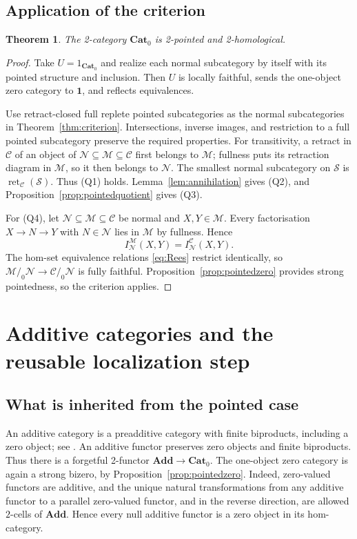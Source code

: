\documentclass[11pt,reqno,a4paper]{amsart}
\newtheorem{theorem}{Theorem}[section]
\theoremstyle{definition}
\theoremstyle{remark}
\newcommand{\C}{\mathcal{C}}
\newcommand{\M}{\mathcal{M}}
\newcommand{\N}{\mathcal{N}}
\newcommand{\0}{\mathbf{0}}
\renewcommand{\1}{\mathbf{1}}
\newcommand{\Pt}{\mathbf{Cat}_{0}}
\newcommand{\Add}{\mathbf{Add}}
\newcommand{\Scl}{\mathcal S}
\newcommand{\pq}[2]{#1/_{\!0}#2}
\DeclareMathOperator{\ret}{ret}
\begin{document}
\subsection{Application of the criterion}

\begin{theorem}\label{thm:pointed}
The 2-category $\Pt$ is 2-pointed and 2-homological.
\end{theorem}
\begin{proof}
Take $U=1_{\Pt}$ and realize each normal subcategory by
itself with its pointed structure and inclusion. Then $U$
is locally faithful, sends the one-object zero category to
$\mathbf1$, and reflects equivalences.

Use retract-closed full replete pointed subcategories as the normal
subcategories in Theorem~\ref{thm:criterion}. Intersections, inverse
images, and restriction to a full pointed subcategory preserve the
required properties. For transitivity, a retract in $\C$ of an object
of $\N\subseteq\M\subseteq\C$ first belongs to $\M$; fullness
puts its retraction diagram in $\M$, so it then belongs to $\N$.
The smallest normal subcategory on $\Scl$ is $\ret_{\C}(\Scl)$.
Thus (Q1) holds. Lemma~\ref{lem:annihilation} gives (Q2), and
Proposition~\ref{prop:pointedquotient} gives (Q3).

For (Q4), let $\N\subseteq\M\subseteq\C$ be normal and
$X,Y\in\M$. Every factorisation $X\to N\to Y$ with $N\in\N$
lies in $\M$ by fullness. Hence
\[
 I_{\N}^{\M}(X,Y)=I_{\N}^{\C}(X,Y).
\]
The hom-set equivalence relations \eqref{eq:Rees} restrict identically,
so $\pq{\M}{\N}\to\pq{\C}{\N}$ is fully faithful.
Proposition~\ref{prop:pointedzero} provides strong pointedness,
so the criterion applies.
\end{proof}

\section{Additive categories and the reusable localization step}\label{sec:additive}

\subsection{What is inherited from the pointed case}

An additive category is a preadditive category with finite biproducts,
including a zero object; see \cite{StacksAdd}. An additive functor
preserves zero objects and finite biproducts. Thus there is a forgetful
2-functor $\Add\to\Pt$. The one-object zero category is again a
strong bizero, by Proposition~\ref{prop:pointedzero}. Indeed,
zero-valued functors are additive, and the unique natural
transformations from any additive functor to a parallel zero-valued
functor, and in the reverse direction, are allowed $2$-cells of
$\Add$. Hence every null additive functor is a zero object in its
hom-category.
\end{document}
